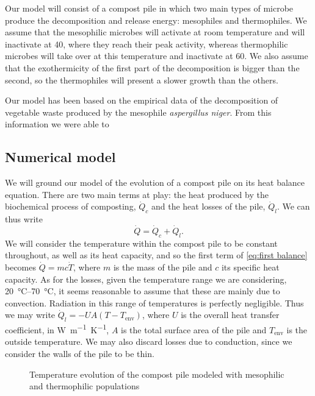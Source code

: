 \documentclass[12pt, a4paper, twocolumn]{article}
\numberwithin{table}{section}
\numberwithin{figure}{section}
\numberwithin{equation}{section}
\begin{document}
Our model will consist of a compost pile in which two main types of microbe produce the decomposition and release energy: mesophiles and thermophiles. We assume that the mesophilic microbes will activate at room temperature and will inactivate at \si{40}{\celsius}, where they reach their peak activity, whereas thermophilic microbes will take over at this temperature and inactivate at \si{60}{\celsius}. We also assume that the exothermicity of the first part of the decomposition is bigger than the second, so the thermophiles will present a slower growth than the others.

Our model has been based on the empirical data of the decomposition of vegetable waste produced by the mesophile \textit{aspergillus niger}\cite{mesophile}. From this information we were able to 

\subsection{Numerical model}
We will ground our model of the evolution of a compost pile on its heat balance equation. There are two main terms at play: the heat produced by the biochemical process of composting, \( \dot{Q}_c \) and the heat losses of the pile, \( \dot{Q}_l \). We can thus write
\begin{equation} \label{eq:first balance}
	\dot{Q} = \dot{Q}_c + \dot{Q}_l. 
\end{equation}
We will consider the temperature within the compost pile to be constant throughout, as well as its heat capacity, and so the first term of \cref{eq:first balance} becomes \( \dot{Q} = mc\dot{T} \), where \( m \) is the mass of the pile and \( c \) its specific heat capacity. As for the losses, given the temperature range we are considering, \SIrange{20}{70}{\celsius}, it seems reasonable to assume that these are mainly due to convection. Radiation in this range of temperatures is perfectly negligible. Thus we may write \( \dot{Q}_l = -UA\left(T - T_\text{env}\right) \), where \( U \) is the overall heat transfer coefficient, in \si{W.m^{-1}.K^{-1}}, \( A \) is the total surface area of the pile and \( T_\text{env} \) is the outside temperature. We may also discard losses due to conduction, since we consider the walls of the pile to be thin.

\begin{figure}[htb]
	\sffamily \footnotesize \centering
	
	\caption{Temperature evolution of the compost pile modeled with mesophilic and thermophilic populations}
	\label{fig:temp-mesos-termos}
\end{figure}
\end{document}
